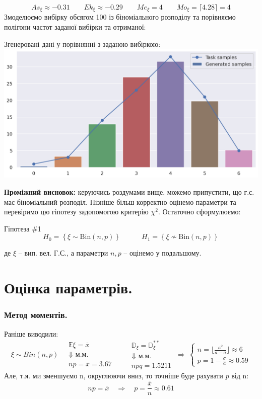 \documentclass[14pt,a4paper]{scrartcl}
\theoremstyle{definition}
\theoremstyle{remark}
\theoremstyle{definition}
\theoremstyle{definition}
\begin{document}
    \[
         As_{\xi} \approx - 0.31 \qquad Ek_{\xi} \approx - 0.29 \qquad Me_{\xi} = 4 \qquad Mo_{\xi} = \lceil 4.28 \rceil = 4
    \]
    \newpage
    Змоделюємо вибірку обсягом 100 із біноміального розподілу та порівняємо полігони частот заданої вибірки та отриманої:
    \begin{center}
    Згенеровані дані у порівнянні з заданою вибіркою:
     \includegraphics[scale=0.3]{assets/РР_126_Терещенко-8fcfc196.png}
    \end{center}
    \textbf{Проміжний висновок:} керуючись роздумами вище, можемо припустити, що г.с. має біноміальний розподіл. Пізніше більш корректно оцінемо параметри та перевіримо цю гіпотезу задопомогою критерію $\chi^2$. Остаточно сформулюємо:
    \begin{center}
     Гіпотеза \#1
     \[
     H_0 = \left\lbrace \xi \sim \mathrm{Bin}(n,p) \right\rbrace \qquad \quad
      H_1 = \left\lbrace \xi \nsim \mathrm{Bin}(n,p) \right\rbrace
     \]
    \end{center}
    де \( \xi \) -- вип. вел. Г.С., а параметри \( n,p \) -- оцінемо у подальшому.


  \newpage

\section{Оцінка параметрів.}
\subsubsection*{Метод моментів.}
Раніше виводили:
\[
 \xi \sim Bin(n, p) \quad \begin{gathered}
  \mathbb{E} \xi = \overline{x}\\
  \Downarrow \text{ м.м.}\\
  np = \overline{x} = 3.67
 \end{gathered} \qquad \begin{gathered}
  \mathbb{D}_{\xi} = \mathbb{D}_{\xi}^{**}\\
  \Downarrow \text{ м.м.}\\
   npq = 1.5211
 \end{gathered} \ \Longrightarrow \  \begin{cases}
  n = \lfloor \frac{a^2}{a-\sigma} \rfloor \approx 6 \\
  p = 1 - \frac{\sigma}{a } \approx 0.59
 \end{cases}
\]
Але, т.я. ми зменшуємо n, округлюючи вниз, то точніше буде рахувати \( p \) від n:
\[
 np = \overline{x} \quad \Longrightarrow \quad p = \frac{\overline{x}}{n} \approx 0.61
\]
\end{document}
